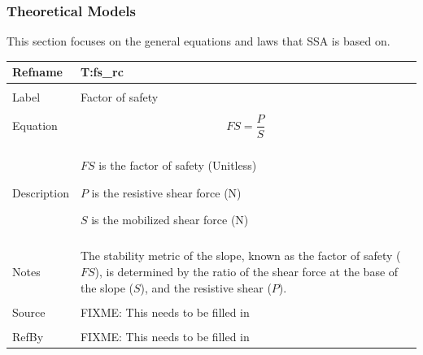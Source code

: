 \documentclass[12pt]{article}
\begin{document}
\subsubsection{Theoretical Models}
\label{Sec:TMs}
This section focuses on the general equations and laws that SSA is based on.
~\newline
\noindent \begin{minipage}{\textwidth}
\begin{tabular}{p{} p{}}
\toprule \textbf{Refname} & \textbf{T:fs\_rc}
\label{T:fs\_rc}
\\ \midrule \\
Label & Factor of safety
\\ \midrule \\
Equation & \begin{dmath}
           FS=\frac{P}{S}
           \end{dmath}
\\ \midrule \\
Description & \begin{symbDescription}
              \item{$FS$ is the factor of safety (Unitless)}
              \item{$P$ is the resistive shear force (N)}
              \item{$S$ is the mobilized shear force (N)}
              \end{symbDescription}
\\ \midrule \\
 Notes & The stability metric of the slope, known as the factor of safety ($FS$), is determined by the ratio of the shear force at the base of the slope ($S$), and the resistive shear ($P$).
\\ \midrule \\
Source & FIXME: This needs to be filled in
\\ \midrule \\
RefBy & FIXME: This needs to be filled in
\\ \bottomrule \end{tabular}
\end{minipage}\\
~\newline
\end{document}
